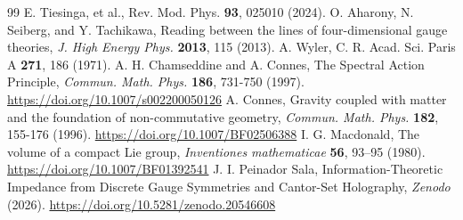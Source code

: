 \documentclass[12pt,a4paper]{article}
\begin{document}
\begin{thebibliography}{99}
 E. Tiesinga, et al., Rev. Mod. Phys. \textbf{93}, 025010 (2024).
 O. Aharony, N. Seiberg, and Y. Tachikawa, Reading between the lines of four-dimensional gauge theories, \textit{J. High Energy Phys.} \textbf{2013}, 115 (2013).
 A. Wyler, C. R. Acad. Sci. Paris A \textbf{271}, 186 (1971).
 A. H. Chamseddine and A. Connes, The Spectral Action Principle, \textit{Commun. Math. Phys.} \textbf{186}, 731-750 (1997). \url{https://doi.org/10.1007/s002200050126}
 A. Connes, Gravity coupled with matter and the foundation of non-commutative geometry, \textit{Commun. Math. Phys.} \textbf{182}, 155-176 (1996). \url{https://doi.org/10.1007/BF02506388}
 I. G. Macdonald, The volume of a compact Lie group, \textit{Inventiones mathematicae} \textbf{56}, 93–95 (1980). \url{https://doi.org/10.1007/BF01392541}
 J. I. Peinador Sala, Information-Theoretic Impedance from Discrete Gauge Symmetries and Cantor-Set Holography, \textit{Zenodo} (2026). \url{https://doi.org/10.5281/zenodo.20546608}
\end{thebibliography}
\end{document}
